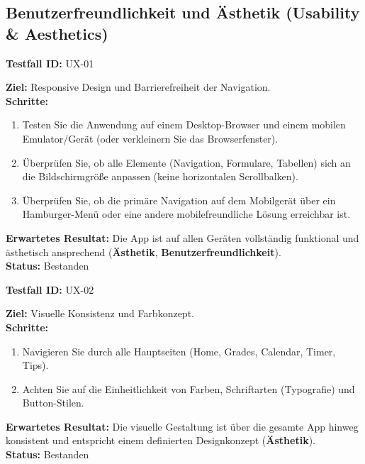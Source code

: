 \documentclass[11pt, a4paper]{article}
\newenvironment{testcase}[1]{%
    \par\vspace{1em}\noindent\begin{minipage}{\linewidth}
    \textbf{Testfall ID:} #1 \\
    \vspace{0.2em}
}{\end{minipage}\par\vspace{1em}}
\begin{document}
\subsection{Benutzerfreundlichkeit und Ästhetik (Usability \& Aesthetics)}

\begin{testcase}{UX-01}
    \textbf{Ziel:} Responsive Design und Barrierefreiheit der Navigation.\\
    \textbf{Schritte:}
    \begin{enumerate}[label=\arabic*.]
        \item Testen Sie die Anwendung auf einem Desktop-Browser und einem mobilen Emulator/Gerät (oder verkleinern Sie das Browserfenster).
        \item Überprüfen Sie, ob alle Elemente (Navigation, Formulare, Tabellen) sich an die Bildschirmgröße anpassen (keine horizontalen Scrollbalken).
        \item Überprüfen Sie, ob die primäre Navigation auf dem Mobilgerät über ein Hamburger-Menü oder eine andere mobilefreundliche Lösung erreichbar ist.
    \end{enumerate}
    \textbf{Erwartetes Resultat:} Die App ist auf allen Geräten vollständig funktional und ästhetisch ansprechend (\textbf{Ästhetik}, \textbf{Benutzerfreundlichkeit}).\\
    \vspace{0.5em}\textbf{Status:} \textcolor{passcolor}{Bestanden}
\end{testcase}

\begin{testcase}{UX-02}
    \textbf{Ziel:} Visuelle Konsistenz und Farbkonzept.\\
    \textbf{Schritte:}
    \begin{enumerate}[label=\arabic*.]
        \item Navigieren Sie durch alle Hauptseiten (Home, Grades, Calendar, Timer, Tips).
        \item Achten Sie auf die Einheitlichkeit von Farben, Schriftarten (Typografie) und Button-Stilen.
    \end{enumerate}
    \textbf{Erwartetes Resultat:} Die visuelle Gestaltung ist über die gesamte App hinweg konsistent und entspricht einem definierten Designkonzept (\textbf{Ästhetik}).\\
    \vspace{0.5em}\textbf{Status:} \textcolor{passcolor}{Bestanden}
\end{testcase}
\end{document}

